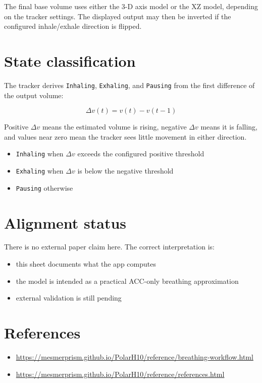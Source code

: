 \documentclass[11pt]{article}
\begin{document}
The final base volume uses either the 3-D axis model or the XZ model, depending
on the tracker settings. The displayed output may then be inverted if the
configured inhale/exhale direction is flipped.

\section*{State classification}

The tracker derives \texttt{Inhaling}, \texttt{Exhaling}, and \texttt{Pausing}
from the first difference of the output volume:

\[
\Delta v(t) = v(t) - v(t-1)
\]

Positive $\Delta v$ means the estimated volume is rising, negative $\Delta v$
means it is falling, and values near zero mean the tracker sees little movement
in either direction.

\begin{itemize}[leftmargin=1.5em]
\item \texttt{Inhaling} when $\Delta v$ exceeds the configured positive threshold
\item \texttt{Exhaling} when $\Delta v$ is below the negative threshold
\item \texttt{Pausing} otherwise
\end{itemize}

\section*{Alignment status}

There is no external paper claim here. The correct interpretation is:

\begin{itemize}[leftmargin=1.5em]
\item this sheet documents what the app computes
\item the model is intended as a practical ACC-only breathing approximation
\item external validation is still pending
\end{itemize}

\section*{References}

\begin{itemize}[leftmargin=1.5em]
\item \url{https://mesmerprism.github.io/PolarH10/reference/breathing-workflow.html}
\item \url{https://mesmerprism.github.io/PolarH10/reference/references.html}
\end{itemize}
\end{document}
